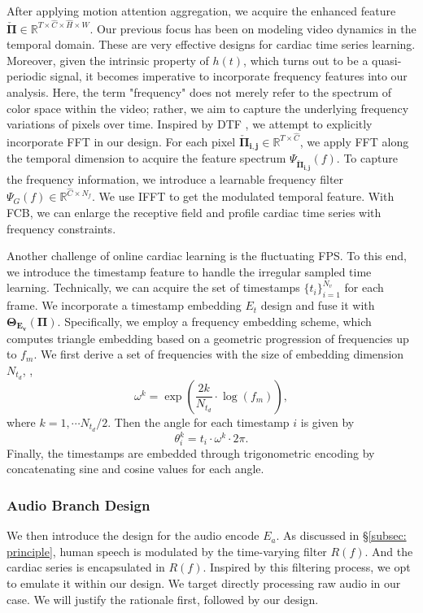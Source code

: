 After applying motion attention aggregation, we acquire the enhanced feature $\bm{\check{\Pi}} \in \mathbb{R}^{T \times \hat{C} \times \hat{H} \times \hat{W}}$. Our previous focus has been on modeling video dynamics in the temporal domain.
These are very effective designs for cardiac time series learning. Moreover, given the intrinsic property of $h(t)$, which turns out to be a quasi-periodic signal,  it becomes imperative to incorporate frequency features into our analysis. Here, the term "frequency" does not merely refer to the spectrum of color space within the video; rather, we aim to capture the underlying frequency variations of pixels over time. 
Inspired by DTF \cite{long2022dynamic}, we 
attempt to explicitly incorporate FFT in our design. For each pixel $\bm{\check{\Pi}_{i,j}} \in \mathbb{R}^{T \times \hat{C}}$, we apply FFT along the temporal dimension to acquire the feature spectrum $\Psi_{\bm{\check{\Pi}_{i,j}}}(f)$. 
To capture the frequency information, we introduce a learnable frequency filter $\Psi_{G}(f) \in \mathbb{R}^{\hat{C} \times N_{f}}$. We use IFFT to get the modulated temporal feature.
With FCB, we can enlarge the receptive field and profile cardiac time series with frequency constraints.

Another challenge of online cardiac learning is the fluctuating FPS. 
To this end, we introduce the timestamp feature to handle the irregular sampled time learning. Technically, we can acquire the set of timestamps $\{t_i\}_{i=1}^{N_v}$ for each frame. We incorporate a timestamp embedding $E_t$ design and fuse it with $\bm{\Theta_{E_v}(\Pi)}$. Specifically, we employ a frequency embedding scheme, which computes triangle embedding based on a geometric progression of frequencies up to $f_m$. We first derive a set of frequencies with the size of embedding dimension $N_{t_d}$, \ie,
\begin{equation}
    \omega^{k} = \exp \left(\frac{2k}{N_{t_d}}\cdot \log (f_m)\right),
\end{equation}
where $k=1, \cdots N_{t_d}/2$. Then the angle for each timestamp $i$ is given by 
\begin{equation}
    \theta_{i}^{k} = t_i \cdot \omega^{k} \cdot 2\pi.
\end{equation}
Finally, the timestamps are embedded through trigonometric encoding by concatenating sine and cosine values for each angle. 




\subsubsection{Audio Branch Design}
We then introduce the design for the audio encode $E_a$. As discussed in \S\ref{subsec: principle}, human speech is modulated by the time-varying filter $R(f)$. And the cardiac series is encapsulated in $R(f)$. Inspired by this filtering process, we opt to emulate it within our design.  We target directly processing raw audio in our case. We will justify the rationale first, followed by our design.

